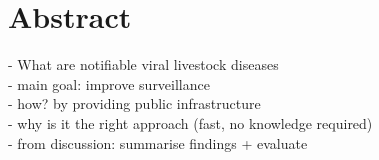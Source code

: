 \chapter*{Abstract}
\todoit

- What are notifiable viral livestock diseases \\
- main goal: improve surveillance \\
- how? by providing public infrastructure \\
- why is it the right approach (fast, no knowledge required) \\
- from discussion: summarise findings + evaluate 
